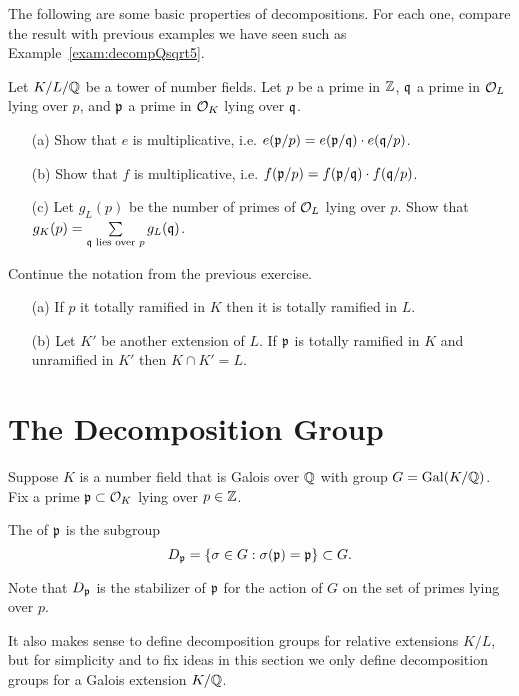 \begin{exercise}\label{ex:ramificationmultiplicative}
The following are some basic properties of decompositions.
For each one, compare the result with previous examples
we have seen such as Example~\ref{exam:decompQsqrt5}.

Let $K/L/\mathbb{Q}$ be a tower of number fields. Let $p$ be a prime
in $\mathbb{Z}$, $\mathfrak{q}$ a prime in $\mathcal{O}_L$ lying over $p$, and $\mathfrak{p}$ a prime
in $\mathcal{O}_K$ lying over $\mathfrak{q}$.
\begin{enumerate}
	\item[(a)] Show that $e$ is multiplicative, i.e. $e(\mathfrak{p}/p)=e(\mathfrak{p}/\mathfrak{q}) \cdot e(\mathfrak{q}/p)$.
	\item[(b)] Show that $f$ is multiplicative, i.e. $f(\mathfrak{p}/p)=f(\mathfrak{p}/\mathfrak{q}) \cdot f(\mathfrak{q}/p)$.
	\item[(c)] Let $g_L(p)$ be the number of primes of $\mathcal{O}_L$ lying over $p$.
	Show that $g_K(p) = \sum\limits_{\mathfrak{q} \text{ lies over } p} g_L(\mathfrak{q})$.
\end{enumerate}
\end{exercise}

\begin{exercise}
Continue the notation from the previous exercise.
\begin{enumerate}
	\item[(a)]
	If $p$ it totally ramified in $K$
	then it is totally ramified in $L$.

	\item[(b)]
	Let $K'$ be another extension of $L$.
	If $\mathfrak{p}$ is totally ramified in $K$ and unramified in $K'$
	then $K\cap K' = L$.
\end{enumerate}

\end{exercise}

\section{The Decomposition Group}
Suppose $K$ is a number field that is Galois over $\mathbb{Q}$ with
group $G=\operatorname{Gal}(K/\mathbb{Q})$.
Fix a prime $\mathfrak{p}\subset \mathcal{O}_K$ lying over $p\in\mathbb{Z}$.
\begin{definition}\label{def:decomp}
The  of $\mathfrak{p}$ is the subgroup
$$
  D_{\mathfrak{p}} = \{\sigma \in G : \sigma(\mathfrak{p})=\mathfrak{p}\} \subset G.
$$
\end{definition}
Note that $D_{\mathfrak{p}}$ is the stabilizer of $\mathfrak{p}$ for
the action of $G$ on the set of primes lying over $p$.

It also makes sense to define decomposition groups for relative
extensions $K/L$, but for simplicity and to fix ideas in this section
we only define decomposition groups for a Galois extension $K/\mathbb{Q}$.

